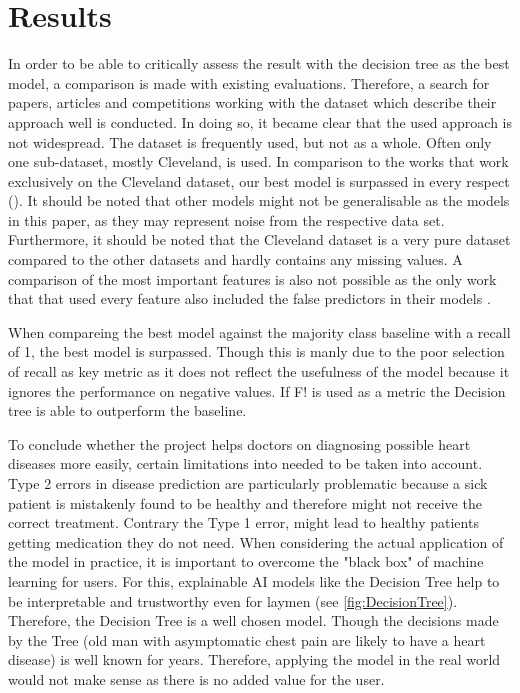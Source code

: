 
\section{Results} \label{sec:results}

In order to be able to critically assess the result with the decision tree as the best model, a comparison is made with existing evaluations. Therefore, a search for papers, articles and competitions working with the dataset which describe their approach well is conducted. In doing so,  it became clear that the used approach is not widespread. The dataset is frequently used, but not as a whole. Often only one sub-dataset, mostly Cleveland, is used.  In comparison to the works that work exclusively on the Cleveland dataset, our best model is surpassed in every respect (\cite{Ayatollahi2019,alotaibi2019, uyar2017}). It should be noted that other models might not be generalisable as the models in this paper, as they may represent noise from the respective data set. Furthermore, it should be noted that the Cleveland dataset is a very pure dataset compared to the other datasets and hardly contains any missing values. 
A comparison of the most important features is also not possible as the only work that that used every feature also included the false predictors in their models \cite{garate-escamila2020}.

When compareing the best model against the majority class baseline with a recall of 1, the best model is surpassed. Though this is manly due to the poor selection of recall as key metric as it does not reflect the usefulness of the model because it ignores the performance on negative values. If F! is used as a metric the Decision tree is able to outperform the baseline. 

To conclude whether the project helps doctors on diagnosing possible heart diseases more easily, certain limitations into needed to be taken into account. Type 2 errors in disease prediction are particularly problematic because a sick patient is mistakenly found to be healthy and therefore might not receive the correct treatment. Contrary the Type 1 error, might lead to healthy patients getting medication they do not need.   When considering the actual application of the model in practice, it is important to overcome the "black box" of machine learning for users. For this, explainable AI models like the Decision Tree help to be interpretable and trustworthy even for laymen (see \cref{fig:DecisionTree}). Therefore, the Decision Tree is a well chosen model. Though the decisions made by the Tree (old man with asymptomatic chest pain are likely to have a heart disease) is well known for years. Therefore, applying the model in the real world would not make sense as there is no added value for the user. 